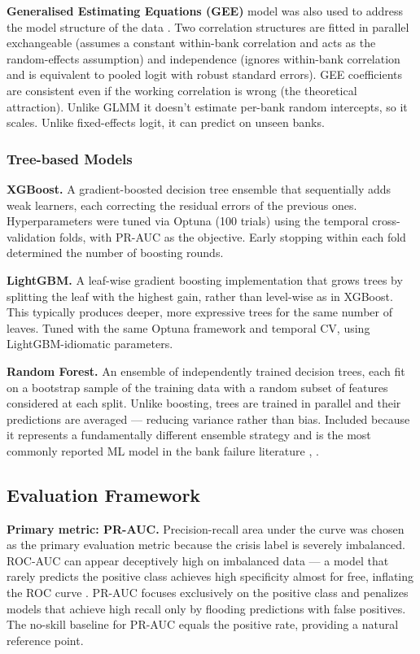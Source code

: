 \documentclass[conference]{IEEEtran}
\begin{document}
\textbf{Generalised Estimating Equations (GEE)} model was also used to address the model structure of the data \cite{b23}. Two correlation structures are fitted in parallel exchangeable (assumes a constant within-bank correlation and acts as the random-effects assumption) and independence (ignores within-bank correlation and is equivalent to pooled logit with robust standard errors). GEE coefficients are consistent even if the working correlation is wrong (the theoretical attraction). Unlike GLMM it doesn't estimate per-bank random intercepts, so it scales. Unlike fixed-effects logit, it can predict on unseen banks.

\subsubsection{Tree-based Models}
\textbf{XGBoost.} A gradient-boosted decision tree ensemble that sequentially adds weak learners, each correcting the residual errors of the previous ones. Hyperparameters were tuned via Optuna (100 trials) using the temporal cross-validation folds, with PR-AUC as the objective. Early stopping within each fold determined the number of boosting rounds. 

\textbf{LightGBM.} A leaf-wise gradient boosting implementation that grows trees by splitting the leaf with the highest gain, rather than level-wise as in XGBoost. This typically produces deeper, more expressive trees for the same number of leaves. Tuned with the same Optuna framework and temporal CV, using LightGBM-idiomatic parameters. 

\textbf{Random Forest.} An ensemble of independently trained decision trees, each fit on a bootstrap sample of the training data with a random subset of features considered at each split. Unlike boosting, trees are trained in parallel and their predictions are averaged — reducing variance rather than bias. Included because it represents a fundamentally different ensemble strategy and is the most commonly reported ML model in the bank failure literature \cite{b1}, \cite{b4}. 

\subsection{Evaluation Framework}
\textbf{Primary metric: PR-AUC.} Precision-recall area under the curve was chosen as the primary evaluation metric because the crisis label is severely imbalanced. ROC-AUC can appear deceptively high on imbalanced data — a model that rarely predicts the positive class achieves high specificity almost for free, inflating the ROC curve \cite{b1}. PR-AUC focuses exclusively on the positive class and penalizes models that achieve high recall only by flooding predictions with false positives. The no-skill baseline for PR-AUC equals the positive rate, providing a natural reference point.
\end{document}
